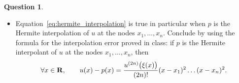 \documentclass[11pt]{article}
\theoremstyle{definition}
\newtheorem{question}{Question}
\begin{document}
\begin{question}
\begin{itemize}
\begin{itemize}
                        \item
                            Equation~\eqref{eq:hermite_interpolation} is true in particular when $p$ is the Hermite interpolation of $u$ at the nodes $x_1, \dotsc, x_n$.
                            Conclude by using the formula for the interpolation error proved in class:
                            if $p$ is the Hermite interpolant of $u$ at the nodes $x_1, \dotsc, x_n$,
                        then
                        \[
                            \forall x \in \mathbf R, \qquad
                            u(x) - p(x) = \frac{u^{(2n)}\bigl(\xi(x)\bigr)}{(2n)!} (x-x_1)^2 \dotsc (x - x_n)^2.
                        \]
                    \end{itemize}
    \end{itemize}

\end{question}
\end{document}
